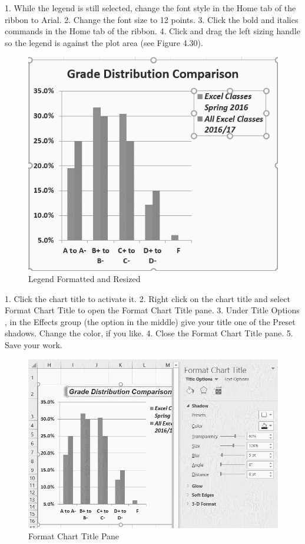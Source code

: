 1.   While the legend is still selected, change the font style in the Home tab of the ribbon to Arial.
2.   Change the font size to 12 points.
3.   Click the bold and italics commands in the Home tab of the ribbon.
4.   Click and drag the left sizing handle so the legend is against the plot area (see Figure 4.30).



\begin{figure}[H]
	\centering
	\includegraphics[width=\maxwidth{.95\linewidth}]{gfx/ch04_fig33}
	\caption{Legend Formatted and Resized}
	\label{04:fig33}
\end{figure}





1. Click the chart title to activate it.
2. Right click on the chart title and select Format Chart Title to open the Format Chart Title
pane.
3. Under Title Options , in the Effects group (the option in the middle) give your title one of the
Preset shadows. Change the color, if you like.
4. Close the Format Chart Title pane.
5. Save your work.



\begin{figure}[H]
	\centering
	\includegraphics[width=\maxwidth{.95\linewidth}]{gfx/ch04_fig34}
	\caption{Format Chart Title Pane}
	\label{04:fig34}
\end{figure}


